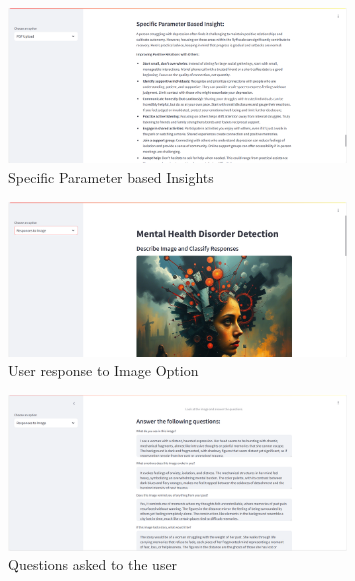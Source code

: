 \begin{figure}[h!]  
    \centering
    \includegraphics[width=0.8\textwidth]{App Images/25 Interface.png}  
    \caption{Specific Parameter based Insights}
    \label{10i23445}  %
\end{figure} 

\pagebreak

\begin{figure}[h!]  
    \centering
    \includegraphics[width=0.8\textwidth]{App Images/26 Interface.png}  
    \caption{User response to Image Option} 
    \label{10i23445}  %
\end{figure} 

\begin{figure}[h!]  
    \centering
    \includegraphics[width=0.8\textwidth]{App Images/27 Interface.png}  
    \caption{Questions asked to the user}
    \label{10i23445}  %
\end{figure} 

